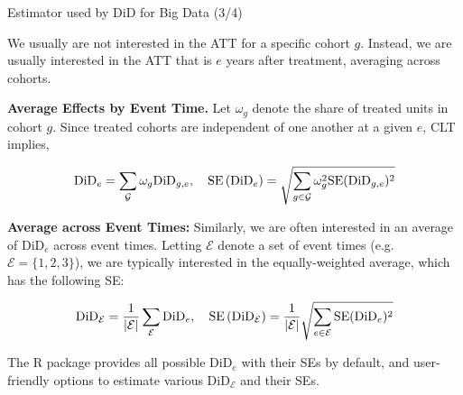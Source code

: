 \documentclass[usenames,dvipsnames]{beamer}
\begin{document}
\begin{frame}{Estimator used by DiD for Big Data (3/4)}

\vspace{-0.1cm}

We usually are not interested in the ATT for a specific cohort $g$. Instead, we are usually interested in the ATT that is $e$ years after treatment, averaging across cohorts.

\textbf{Average Effects by Event Time.} Let  $\omega_g$ denote the share of treated units in cohort $g$. Since treated  cohorts are independent of one another at a given $e$, CLT implies,

\vspace{-0.5cm}

\begin{equation} \notag
\text{DiD}_e =   \sum_\mathcal{G} \omega_g \text{DiD}_{g,e},  
\quad
\text{SE}\left( \text{DiD}_e \right) =  
\sqrt{
\sum_{g \in \mathcal{G}} \omega_g^2 \text{SE}(\text{DiD}_{g,e})^2
}
\end{equation} 

\vspace{-0.25cm}

\textbf{Average across Event Times:} Similarly, we are often interested in an average of  $\text{DiD}_e$ across event times. Letting $\mathcal{E}$ denote a set of event times (e.g. $\mathcal{E} = \{ 1, 2, 3\}$), we are typically interested in the equally-weighted average, which has the following SE:

\vspace{-0.7cm}

\begin{equation} \notag
\text{DiD}_{\mathcal{E}} =  \frac{1}{|\mathcal{E}|} \sum_\mathcal{E} \text{DiD}_e,
\quad
\text{SE}\left( \text{DiD}_\mathcal{E} \right) =  
 \frac{1}{|\mathcal{E}|}
\sqrt{
\sum_{e \in \mathcal{E}} \text{SE}(\text{DiD}_{e})^2
}
\end{equation} 

\vspace{-0.1cm}

The R package provides all possible  $ \text{DiD}_e$ with their SEs by default, and user-friendly options to estimate various $\text{DiD}_\mathcal{E}$ and their SEs.

\end{frame}
\end{document}

